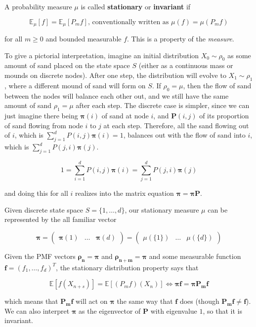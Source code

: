 \documentclass{article}
\begin{document}
    \begin{definition}
      A probability measure $\mu$ is called \textbf{stationary} or \textbf{invariant} if 

        \[\mathbb{E}_\mu[f] = \mathbb{E}_\mu [P_m f] \text{, conventionally written as } \mu(f) = \mu(P_m f)\]

      for all $m \geq 0$ and bounded measurable $f$. This is a property of the \textit{measure}. 
    \end{definition}

    To give a pictorial interpretation, imagine an initial distribution $X_0 \sim \rho_0$ as some amount of sand placed on the state space $S$ (either as a continuous mass or mounds on discrete nodes). After one step, the distribution will evolve to $X_1 \sim \rho_1$, where a different mound of sand will form on $S$. If $\rho_0 = \mu$, then the flow of sand between the nodes will balance each other out, and we still have the same amount of sand $\rho_1 = \mu$ after each step. The discrete case is simpler, since we can just imagine there being $\boldsymbol{\pi} (i)$ of sand at node $i$, and $\mathbf{P} (i, j)$ of its proportion of sand flowing from node $i$ to $j$ at each step. Therefore, all the sand flowing out of $i$, which is $\sum_{j=1}^d P(i, j) \boldsymbol{\pi}(i) = 1$, balances out with the flow of sand into $i$, which is $\sum_{j=1}^d P(j, i) \boldsymbol{\pi}(j)$. 

      \[1 = \sum_{i=1}^d P(i, j) \boldsymbol{\pi}(i) = \sum_{j=1}^d P(j, i) \boldsymbol{\pi}(j)\]

    and doing this for all $i$ realizes into the matrix equation $\boldsymbol{\pi} = \boldsymbol{\pi} \mathbf{P}$. 

    \begin{example}
      Given discrete state space $S = \{1, \ldots, d\}$, our stationary measure $\mu$ can be represented by the all familiar vector 

        \[\boldsymbol{\pi} = \begin{pmatrix} \boldsymbol{\pi} (1) & \ldots & \boldsymbol{\pi} (d) \end{pmatrix} = \begin{pmatrix} \mu(\{1\}) & \ldots & \mu(\{d\}) \end{pmatrix}\] 

      Given the PMF vectors $\boldsymbol{\rho_n} = \boldsymbol{\pi}$ and $\boldsymbol{\rho_{n + m}} = \boldsymbol{\pi}$ and some measurable function $\mathbf{f} = (f_1, \ldots, f_d)^T$, the stationary distribution property says that 

        \[\mathbb{E}[f(X_{n + s})] = \mathbb{E}[(P_m f)(X_n)] \iff \boldsymbol{\pi} \mathbf{f} = \boldsymbol{\pi} \mathbf{P_m} \mathbf{f}\]

      which means that $\mathbf{P_m} \mathbf{f}$ will act on $\boldsymbol{\pi}$ the same way that $\mathbf{f}$ does (though $\mathbf{P_m} \mathbf{f} \neq \mathbf{f}$). We can also interpret $\boldsymbol{\pi}$ as the eigenvector of $\mathbf{P}$ with eigenvalue $1$, so that it is invariant. 
    \end{example}
\end{document}
